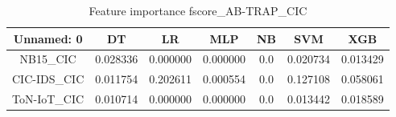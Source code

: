 \begin{table}[H]
\centering
\caption{Feature importance fscore_AB-TRAP_CIC}
\label{fscore_AB-TRAP_CIC}
\begin{tabular}{ccccccc}
\toprule
 Unnamed: 0 &       DT &       LR &      MLP &  NB &      SVM &      XGB \\
\midrule
   NB15\_CIC & 0.028336 & 0.000000 & 0.000000 & 0.0 & 0.020734 & 0.013429 \\
CIC-IDS\_CIC & 0.011754 & 0.202611 & 0.000554 & 0.0 & 0.127108 & 0.058061 \\
ToN-IoT\_CIC & 0.010714 & 0.000000 & 0.000000 & 0.0 & 0.013442 & 0.018589 \\
\bottomrule
\end{tabular}
\end{table}
